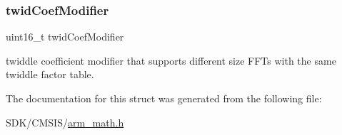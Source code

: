 \subsubsection{\texorpdfstring{twid\+Coef\+Modifier}{twidCoefModifier}}
{\footnotesize\ttfamily uint16\+\_\+t twid\+Coef\+Modifier}

twiddle coefficient modifier that supports different size F\+F\+Ts with the same twiddle factor table. 

The documentation for this struct was generated from the following file\+:\begin{DoxyCompactItemize}
\item 
S\+D\+K/\+C\+M\+S\+I\+S/\mbox{\hyperlink{arm__math_8h}{arm\+\_\+math.\+h}}\end{DoxyCompactItemize}
